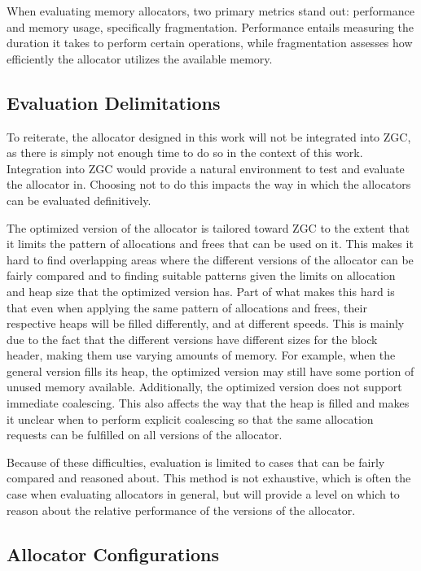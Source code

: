 
When evaluating memory allocators, two primary metrics stand out: performance and memory usage, specifically fragmentation. Performance entails measuring the duration it takes to perform certain operations, while fragmentation assesses how efficiently the allocator utilizes the available memory.

\subsection{Evaluation Delimitations}

To reiterate, the allocator designed in this work will not be integrated into ZGC, as there is simply not enough time to do so in the context of this work. Integration into ZGC would provide a natural environment to test and evaluate the allocator in. Choosing not to do this impacts the way in which the allocators can be evaluated definitively.

The optimized version of the allocator is tailored toward ZGC to the extent that it limits the pattern of allocations and frees that can be used on it. This makes it hard to find overlapping areas where the different versions of the allocator can be fairly compared and to finding suitable patterns given the limits on allocation and heap size that the optimized version has. Part of what makes this hard is that even when applying the same pattern of allocations and frees, their respective heaps will be filled differently, and at different speeds. This is mainly due to the fact that the different versions have different sizes for the block header, making them use varying amounts of memory. For example, when the general version fills its heap, the optimized version may still have some portion of unused memory available. Additionally, the optimized version does not support immediate coalescing. This also affects the way that the heap is filled and makes it unclear when to perform explicit coalescing so that the same allocation requests can be fulfilled on all versions of the allocator.

Because of these difficulties, evaluation is limited to cases that can be fairly compared and reasoned about. This method is not exhaustive, which is often the case when evaluating allocators in general, but will provide a level on which to reason about the relative performance of the versions of the allocator.

\subsection{Allocator Configurations}


